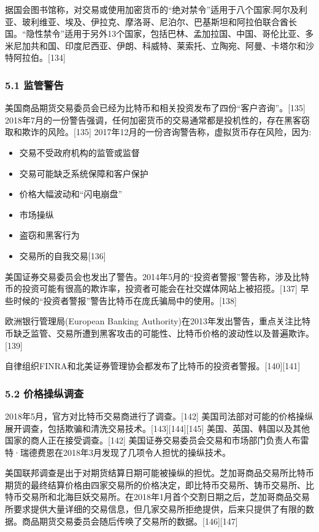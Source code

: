 据国会图书馆称，对交易或使用加密货币的“绝对禁令”适用于八个国家:阿尔及利亚、玻利维亚、埃及、伊拉克、摩洛哥、尼泊尔、巴基斯坦和阿拉伯联合酋长国。“隐性禁令”适用于另外13个国家，包括巴林、孟加拉国、中国、哥伦比亚、多米尼加共和国、印度尼西亚、伊朗、科威特、莱索托、立陶宛、阿曼、卡塔尔和沙特阿拉伯。[134]
\subsubsection{5.1 监管警告}
美国商品期货交易委员会已经为比特币和相关投资发布了四份“客户咨询”。[135] 2018年7月的一份警告强调，任何加密货币的交易通常都是投机性的，存在黑客窃取和欺诈的风险。[135] 2017年12月的一份咨询警告称，虚拟货币存在风险，因为:
\begin{itemize}
\item 交易不受政府机构的监管或监督
\item 交易可能缺乏系统保障和客户保护
\item 价格大幅波动和“闪电崩盘”
\item 市场操纵
\item 盗窃和黑客行为
\item 交易所的自我交易[136]
\end{itemize}
美国证券交易委员会也发出了警告。2014年5月的“投资者警报”警告称，涉及比特币的投资可能有很高的欺诈率，投资者可能会在社交媒体网站上被招揽。[137] 早些时候的“投资者警报”警告比特币在庞氏骗局中的使用。[138]

欧洲银行管理局(European Banking Authority)在2013年发出警告，重点关注比特币缺乏监管、交易所遭到黑客攻击的可能性、比特币价格的波动性以及普遍欺诈。[139]

自律组织FINRA和北美证券管理协会都发布了比特币的投资者警报。[140][141]
\subsubsection{5.2 价格操纵调查}
2018年5月，官方对比特币交易商进行了调查。[142] 美国司法部对可能的价格操纵展开调查，包括欺骗和清洗交易技术。[143][144][145] 美国、英国、韩国以及其他国家的商人正在接受调查。[142] 美国证券交易委员会交易和市场部门负责人布雷特·瑞德费恩在2018年3月发现了几项令人担忧的操纵技术。

美国联邦调查是出于对期货结算日期可能被操纵的担忧。芝加哥商品交易所比特币期货的最终结算价格由四家交易所的价格决定，即比特币交易所、铸币交易所、比特币交易所和北海巨妖交易所。在2018年1月首个交割日期之后，芝加哥商品交易所要求提供大量详细的交易信息，但几家交易所拒绝提供，后来只提供了有限的数据。商品期货交易委员会随后传唤了交易所的数据。[146][147]

